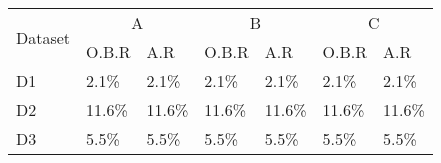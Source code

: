 \begin{table}
  \begin{tabular}{|l|l|l|l|l|l|l|}
    \hline
    \multirow{2}{*}{Dataset} &
      \multicolumn{2}{c}{A} &
      \multicolumn{2}{c}{B} &
      \multicolumn{2}{c|}{C} \\
    & O.B.R & A.R & O.B.R & A.R & O.B.R & A.R \\
    \hline
    D1 & 2.1\% & 2.1\% & 2.1\% & 2.1\% & 2.1\% & 2.1\% \\
    \hline
    D2 & 11.6\% & 11.6\% & 11.6\% & 11.6\% & 11.6\% & 11.6\% \\
    \hline
    D3 & 5.5\% & 5.5\% & 5.5\% & 5.5\% & 5.5\% & 5.5\% \\
    \hline
  \end{tabular}
\end{table}
